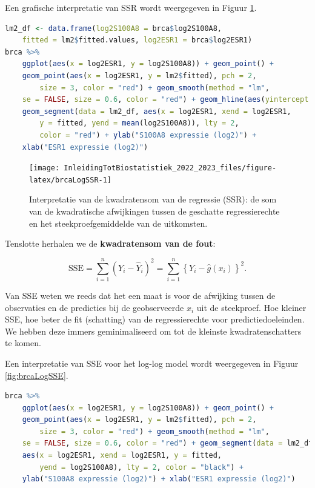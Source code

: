 \documentclass[
  12pt,dutch,coursenotes]{book}
\begin{document}
Een grafische interpretatie van SSR wordt weergegeven in Figuur \ref{fig:brcaLogSSR}.

\begin{lstlisting}[language=R]
lm2_df <- data.frame(log2S100A8 = brca$log2S100A8,
    fitted = lm2$fitted.values, log2ESR1 = brca$log2ESR1)
brca %>%
    ggplot(aes(x = log2ESR1, y = log2S100A8)) + geom_point() +
    geom_point(aes(x = log2ESR1, y = lm2$fitted), pch = 2,
        size = 3, color = "red") + geom_smooth(method = "lm",
    se = FALSE, size = 0.6, color = "red") + geom_hline(aes(yintercept = mean(log2S100A8))) +
    geom_segment(data = lm2_df, aes(x = log2ESR1, xend = log2ESR1,
        y = fitted, yend = mean(log2S100A8)), lty = 2,
        color = "red") + ylab("S100A8 expressie (log2)") +
    xlab("ESR1 expressie (log2)")
\end{lstlisting}

\begin{figure}

{\centering \texttt{[image: InleidingTotBiostatistiek\_2022\_2023\_files/figure-latex/brcaLogSSR-1]} 

}

\caption{Interpretatie van de kwadratensom van de regressie (SSR): de som van de kwadratische afwijkingen tussen de geschatte regressierechte en het steekproefgemiddelde van de uitkomsten.}\label{fig:brcaLogSSR}
\end{figure}

Tenslotte herhalen we de \textbf{kwadratensom van de fout}:

\[ \text{SSE} = \sum_{i=1}^n (Y_i-\hat{Y}_i )^2 = \sum_{i=1}^n \left\{Y_i-\hat{g}\left(x_i\right)\right\}^2.\]

Van SSE weten we reeds dat het een maat is voor de afwijking tussen de observaties en de predicties bij de geobserveerde \(x_i\) uit de steekproef.
Hoe kleiner SSE, hoe beter de fit (schatting) van de regressierechte voor predictiedoeleinden. We hebben deze immers geminimaliseerd om tot de kleinste kwadratenschatters te komen.

Een interpretatie van SSE voor het log-log model wordt weergegeven in Figuur \ref{fig:brcaLogSSE}.

\begin{lstlisting}[language=R]
brca %>%
    ggplot(aes(x = log2ESR1, y = log2S100A8)) + geom_point() +
    geom_point(aes(x = log2ESR1, y = lm2$fitted), pch = 2,
        size = 3, color = "red") + geom_smooth(method = "lm",
    se = FALSE, size = 0.6, color = "red") + geom_segment(data = lm2_df,
    aes(x = log2ESR1, xend = log2ESR1, y = fitted,
        yend = log2S100A8), lty = 2, color = "black") +
    ylab("S100A8 expressie (log2)") + xlab("ESR1 expressie (log2)")
\end{lstlisting}
\end{document}
